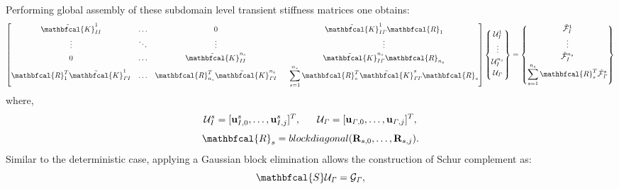 \documentclass{article}
\begin{document}
Performing global assembly of these subdomain level transient stiffness matrices one obtains:
\begin{equation}\label{Eq:GAssembly_Sto}
{\begin{bmatrix}
     \tilde{\mathbfcal{K}}_{II}^1 & \dots  &   0    \ \  &  \tilde{\mathbfcal{K}}_{I {\it{\Gamma}}}^1 \mathbfcal{R}_1
\\[0.3em]
     \vdots   & \ddots & \vdots \ \  &  \vdots
\\[0.3em]
     0        & \dots  &  \tilde{\mathbfcal{K}}_{II}^{n_s} \ \ &  \tilde{\mathbfcal{K}}_{I {\it{\Gamma}}}^{n_s} \mathbfcal{R}_{n_s}
\\[0.3em]
    \mathbfcal{R}^T_1 \tilde{\mathbfcal{K}}_{{\it{\Gamma}} I}^1 & \dots  &  \mathbfcal{R}^T_{n_s} \tilde{\mathbfcal{K}}_{{\it{\Gamma}} I}^{n_s} \ \ & \displaystyle\sum_{s=1}^{n_s} \mathbfcal{R}^T_s \tilde{\mathbfcal{K}}_{{\it{\Gamma}} {\it{\Gamma}}}^s \mathbfcal{R}_s
\end{bmatrix}}
\begin{Bmatrix}
     \mathcal{U}_I^1
\\[0.3em]
     \vdots
\\[0.3em]
      \mathcal{U}_{I}^{n_s}
\\[0.3em]
      \mathcal{U}_{\it{\Gamma}}
\\[0.3em]
\end{Bmatrix}  =
\begin{Bmatrix}
     \tilde{ \mathcal{F} }_I^1
\\[0.3em]
     \vdots
\\[0.3em]
     \tilde{\mathcal{F}}_{I}^{n_s}
\\[0.3em]
     \displaystyle\sum_{s=1}^{n_s} \mathbfcal{R}^T_s  \tilde{\mathcal{F}}_{\it{\Gamma}}^s
\end{Bmatrix}
\end{equation}
where,
\begin{equation}
\mathcal{U}_I^s = [{\bf{u}}^s_{I,0}, \dots, {\bf{u}}^s_{I,j} ]^T, \ \ \ \ \ \mathcal{U}_{\it\Gamma} = [{\bf{u}}_{{\it{\Gamma}},0}, \dots, {\bf{u}}_{{\it{\Gamma}},j}]^T,
\end{equation}
\begin{equation}\label{Eq.sto_restrict}
\mathbfcal{R}_s = blockdiagonal ( {\bf{R}}_{s,0},\dots,{\bf{R}}_{s,j}).
\end{equation}
Similar to the deterministic case, applying a Gaussian block elimination allows the construction of Schur complement as:
\begin{equation}\label{eq:Sto_Schur}
\mathbfcal{S} \mathcal{U}_{\it\Gamma} = \mathcal{G}_{\it\Gamma},
\end{equation}
\end{document}
